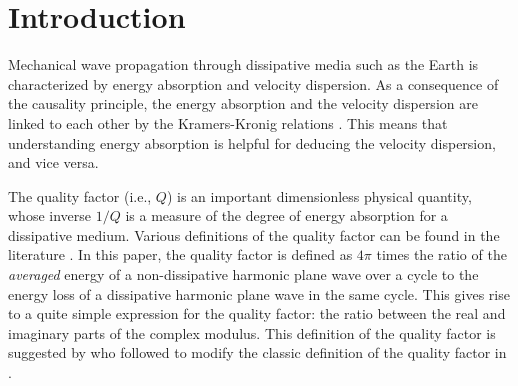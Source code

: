 \documentclass[article]{./macros/elsarticle_qh}
\begin{document}

\section{Introduction}
Mechanical wave propagation through dissipative media such as the Earth is characterized by energy absorption and velocity dispersion. As a consequence of the causality principle, the energy absorption and the velocity dispersion are linked to each other by the Kramers-Kronig relations \cite[e.g.,][]{kronig:1926,futterman:1962,carcione:2014}. This means that understanding energy absorption is helpful for deducing the velocity dispersion, and vice versa. 

The quality factor (i.e., $Q$) is an important dimensionless physical quantity, whose inverse $1/Q$ is a measure of the degree of energy absorption for a dissipative medium. Various definitions of the quality factor can be found in the literature \citep[e.g.][]{green:1955,knopoff:1958,buchen:1971,hamilton:1972,connell:1978,toksoz:1981,carcione:2014}. In this paper, the quality factor is defined as $4\pi$ times the ratio of the \textit{averaged} energy of a non-dissipative harmonic plane wave over a cycle to the energy loss of a dissipative harmonic plane wave in the same cycle. This gives rise to a quite simple expression for the quality factor: the ratio between the real and imaginary parts of the complex modulus. This definition of the quality factor is suggested by \cite{connell:1978} who followed \cite{dain:1962} to modify the classic definition of the quality factor in \cite{knopoff:1958}. 
 
\end{document}
